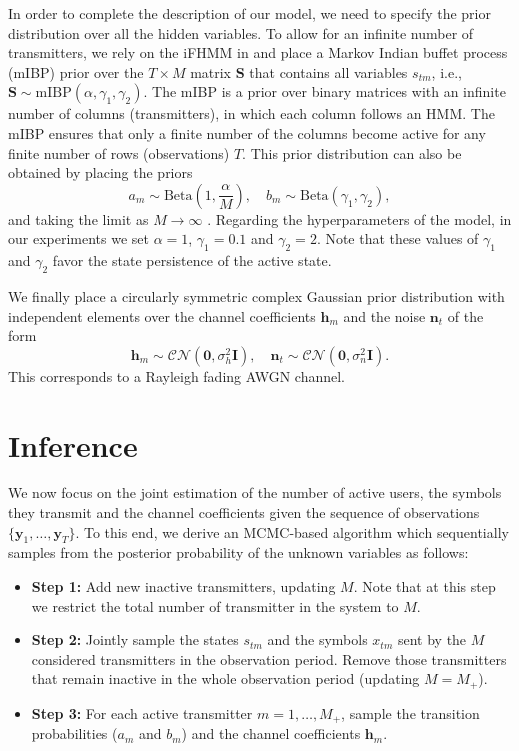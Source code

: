 \documentclass[a4paper]{article}
\def\Sb{\mathbf{S}}
\def\nt{\mathbf{n}_t}
\def\hm{\mathbf{h}_m}
\def\xtm{x_{tm}}
\def\stm{s_{tm}}
\def\CN{\mathcal{CN}}
\begin{document}
In order to complete the description of our model, we need to specify the prior distribution over all the hidden variables. To allow for an infinite number of transmitters, we rely on the iFHMM in \cite{IFHMM} and place a Markov Indian buffet process (mIBP) prior over the $T\times M$ matrix $\Sb$ that contains all variables $\stm$, i.e., $\Sb\sim \textrm{mIBP}(\alpha,\gamma_1,\gamma_2)$. The mIBP is a prior over binary matrices with an infinite number of columns (transmitters), in which each column follows an HMM. The mIBP ensures that only a finite number of the columns become active for any finite number of rows (observations) $T$. This prior distribution can also be obtained by placing the priors
\begin{equation}
a_m\sim\textrm{Beta}\left(1,\frac{\alpha}{M}\right),\quad b_m\sim\textrm{Beta}(\gamma_1,\gamma_2),
\end{equation}
and taking the limit as $M\rightarrow\infty$ \cite{IFHMM}. Regarding the hyperparameters of the model, in our experiments we set $\alpha=1$, $\gamma_1=0.1$ and $\gamma_2=2$. Note that these values of $\gamma_1$ and $\gamma_2$ favor the state persistence of the active state.

We finally place a circularly symmetric complex Gaussian prior distribution with independent elements over the channel coefficients $\hm$ and the noise $\nt$ of the form
\begin{equation}
\hm \sim \CN(\mathbf{0},\sigma_h^2 \mathbf{I}),\quad
\nt \sim \CN(\mathbf{0},\sigma_n^2 \mathbf{I}).
\end{equation}
This corresponds to a Rayleigh fading AWGN channel.

\section{Inference}
\label{sec:inference}

We now focus on the joint estimation of the number of active users, the symbols they transmit and the channel coefficients given the sequence of observations $\{\mathbf{y}_1, \ldots, \mathbf{y}_T\}$. To this end, we derive an MCMC-based algorithm which sequentially samples from the posterior probability of the unknown variables as follows:
\begin{itemize}
\item \textbf{Step 1:} Add new inactive transmitters, updating $M$. Note that at this step we restrict the total number of transmitter in the system to $M$.
\item \textbf{Step 2:} Jointly sample the states $\stm$ and the symbols $\xtm$ sent by the $M$ considered transmitters in the observation period. Remove those transmitters that remain inactive in the whole observation period (updating $M=M_+$).
\item \textbf{Step 3:} For each active transmitter $m=1,\ldots, M_+$, sample the transition probabilities ($a_m$ and $b_m$) and the channel coefficients $\hm$.
\end{itemize}
\end{document}
